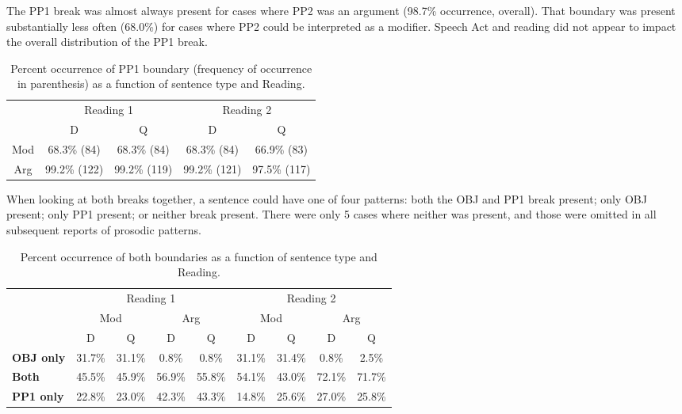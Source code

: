 \documentclass[11pt,oneside]{book}
\begin{document}
The PP1 break was almost always present for cases where PP2 was an argument (98.7\% occurrence, overall). That boundary was present substantially less often (68.0\%) for cases where PP2 could be interpreted as a modifier. Speech Act and reading did not appear to impact the overall distribution of the PP1 break.

\begin{table}[!h]

\caption{\label{tab:pp1}Percent occurrence of PP1 boundary (frequency of occurrence in parenthesis) as a function of sentence type and Reading.}
\centering
\begin{tabular}{ccccc}
\toprule
\multicolumn{1}{c}{ } & \multicolumn{2}{c}{Reading 1} & \multicolumn{2}{c}{Reading 2} \\
\cmidrule(l{3pt}r{3pt}){2-3} \cmidrule(l{3pt}r{3pt}){4-5}
 & D & Q & D & Q\\
\midrule
Mod & 68.3\% (84) & 68.3\% (84) & 68.3\% (84) & 66.9\% (83)\\
Arg & 99.2\% (122) & 99.2\% (119) & 99.2\% (121) & 97.5\% (117)\\
\bottomrule
\end{tabular}
\end{table}

When looking at both breaks together, a sentence could have one of four patterns: both the OBJ and PP1 break present; only OBJ present; only PP1 present; or neither break present. There were only 5 cases where neither was present, and those were omitted in all subsequent reports of prosodic patterns.

\begin{table}[!h]

\caption{\label{tab:bothbreaks}Percent occurrence of both boundaries as a function of sentence type and Reading.}
\centering
\begin{tabular}{>{\bfseries}lcccccccc}
\toprule
\multicolumn{1}{c}{ } & \multicolumn{4}{c}{Reading 1} & \multicolumn{4}{c}{Reading 2} \\
\cmidrule(l{3pt}r{3pt}){2-5} \cmidrule(l{3pt}r{3pt}){6-9}
\multicolumn{1}{c}{ } & \multicolumn{2}{c}{Mod} & \multicolumn{2}{c}{Arg} & \multicolumn{2}{c}{Mod} & \multicolumn{2}{c}{Arg} \\
\cmidrule(l{3pt}r{3pt}){2-3} \cmidrule(l{3pt}r{3pt}){4-5} \cmidrule(l{3pt}r{3pt}){6-7} \cmidrule(l{3pt}r{3pt}){8-9}
  & D & Q & D & Q & D & Q & D & Q\\
\midrule
OBJ only & 31.7\% & 31.1\% & 0.8\% & 0.8\% & 31.1\% & 31.4\% & 0.8\% & 2.5\%\\
Both & 45.5\% & 45.9\% & 56.9\% & 55.8\% & 54.1\% & 43.0\% & 72.1\% & 71.7\%\\
PP1 only & 22.8\% & 23.0\% & 42.3\% & 43.3\% & 14.8\% & 25.6\% & 27.0\% & 25.8\%\\
\bottomrule
\end{tabular}
\end{table}
\end{document}
